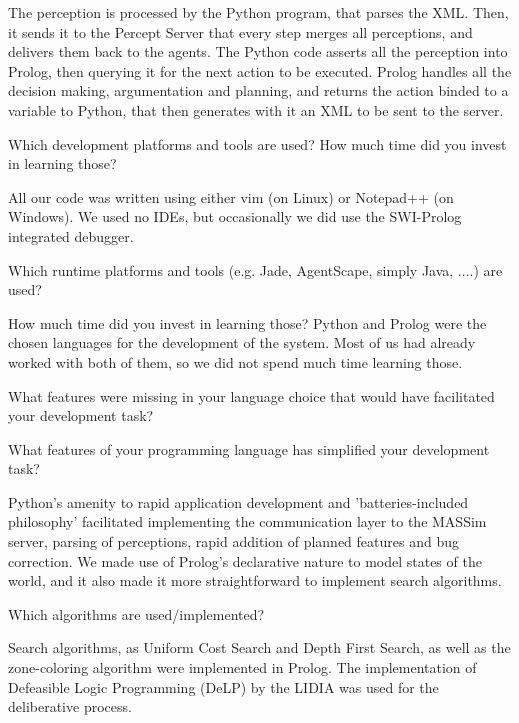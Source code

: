 The perception is processed by the Python program, that parses the XML. Then, it
sends it to the Percept Server that every step merges all perceptions, and
delivers them back to the agents.  The Python code asserts all the perception
into Prolog, then querying it for the next action to be executed.  Prolog
handles all the decision making, argumentation and planning, and returns the
action binded to a variable to Python, that then generates with it an XML to be
sent to the server.

\begin{question}
Which development platforms and tools are used? How much time did you invest in
learning those?  
\end{question}

All our code was written using either vim (on Linux) or Notepad++ (on Windows).
We used no IDEs, but occasionally we did use the SWI-Prolog integrated debugger.

\begin{question}
Which runtime platforms and tools (e.g. Jade, AgentScape, simply Java, ....) are
used? 
\end{question}

How much time did you invest in learning those?  Python and Prolog were the
chosen languages for the development of the system. Most of us had already
worked with both of them, so we did not spend much time learning those.

\begin{question}
What features were missing in your language choice that would have facilitated
your development task?
\end{question}

\begin{question}
What features of your programming language has simplified your development
task?  
\end{question}

Python's amenity to rapid application development and 'batteries-included
philosophy' facilitated implementing the communication layer to the MASSim
server, parsing of perceptions, rapid addition of planned features and bug
correction.  We made use of Prolog's declarative nature to model states of the
world, and it also made it more straightforward to implement search algorithms.

\begin{question}
Which algorithms are used/implemented?  
\end{question}

Search algorithms, as Uniform Cost Search and Depth First Search, as well as the
zone-coloring algorithm were implemented in Prolog.  The implementation of
Defeasible Logic Programming (DeLP) by the LIDIA was used for the deliberative
process.

